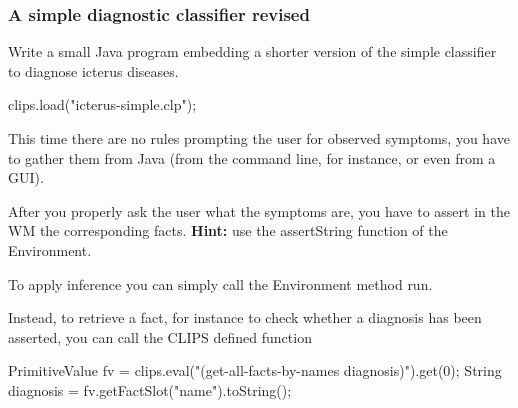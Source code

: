\documentclass[xcolor={usenames,dvipsnames,svgnames}, compress]{beamer}
\begin{document}
\begin{frame}[fragile]
  \frametitle{A simple diagnostic classifier revised}
  Write a small Java program embedding a shorter version of the simple
  classifier to diagnose icterus diseases.\par
  \begin{java-code}
    clips.load("icterus-simple.clp");
  \end{java-code}
  This time there are no
  rules prompting the user for observed symptoms, you have to gather
  them from Java (from the command line, for instance, or even from a
  GUI).\par\bigskip
  After you properly ask the user what the symptoms are, you have to
  assert in the WM the corresponding facts. \textbf{Hint:} use the assertString
  function of the Environment.\par\bigskip

  To apply inference you can simply call the Environment method
  \textsf{run}.\par\bigskip

  Instead, to retrieve a fact, for instance to check whether a
  diagnosis has been asserted, you can call the CLIPS defined function 
  \begin{java-code}
    PrimitiveValue fv =
        clips.eval("(get-all-facts-by-names diagnosis)").get(0);
    String diagnosis = fv.getFactSlot("name").toString();
  \end{java-code}
\end{frame}
\end{document}
